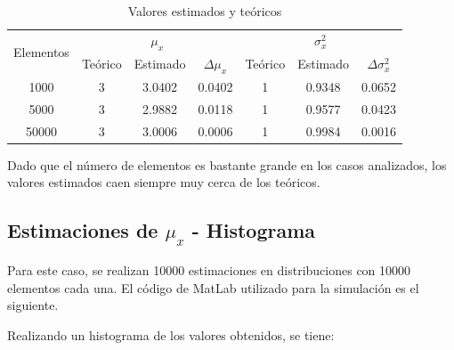 \begin{table}[!ht]
\begin{centering}

\begin{tabular}{|c||c|c|c||c|c|c|}
\hline 
\multirow{2}{*}{Elementos} & \multicolumn{3}{c||}{$\mu_x$} & \multicolumn{3}{c|}{$\sigma^2_x$}\tabularnewline
\cline{2-7} 
 & Te\'orico & Estimado & $\Delta \mu_x$ & Te\'orico & Estimado & $\Delta \sigma^2_x$ \\
\hline 
\hline 
1000 & 3 & 3.0402 & 0.0402 & 1 & 0.9348 & 0.0652\\
\hline 
5000 & 3 & 2.9882 & 0.0118 & 1 & 0.9577 & 0.0423\\
\hline 
50000 & 3 & 3.0006 & 0.0006 & 1 & 0.9984 & 0.0016\\
\hline 
\end{tabular}
\par\end{centering}
\caption{Valores estimados y te\'oricos}

\end{table}

Dado que el n\'umero de elementos es bastante grande en los casos analizados, los valores estimados caen siempre muy cerca de los te\'oricos.

\subsection{Estimaciones de $\mu_x$ - Histograma}

Para este caso, se realizan 10000 estimaciones en distribuciones con 10000 elementos cada una. El c\'odigo de MatLab utilizado para la simulaci\'on es el siguiente.



\newpage

Realizando un histograma de los valores obtenidos, se tiene:

